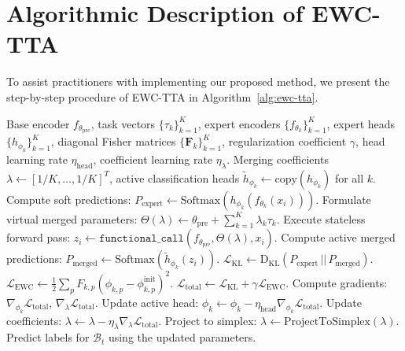 \documentclass{article}
\theoremstyle{plain}
\theoremstyle{definition}
\theoremstyle{remark}
\begin{document}
\section{Algorithmic Description of EWC-TTA}
\label{appendix-algo}

To assist practitioners with implementing our proposed method, we present the step-by-step procedure of EWC-TTA in Algorithm~\ref{alg:ewc-tta}.

\begin{algorithm}[tb]
   \caption{EWC-TTA Test-Time Adaptation}
   \label{alg:ewc-tta}
\begin{algorithmic}[1]
    Base encoder $f_{\theta_{\text{pre}}}$, task vectors $\{\tau_k\}_{k=1}^K$, expert encoders $\{f_{\theta_k}\}_{k=1}^K$, expert heads $\{h_{\phi_k}\}_{k=1}^K$, diagonal Fisher matrices $\{\mathbf{F}_k\}_{k=1}^K$, regularization coefficient $\gamma$, head learning rate $\eta_{\text{head}}$, coefficient learning rate $\eta_\lambda$.
    Merging coefficients $\lambda \leftarrow [1/K, \dots, 1/K]^T$, active classification heads $\tilde{h}_{\phi_k} \leftarrow \text{copy}(h_{\phi_k})$ for all $k$.
   \STATE Compute soft predictions: $P_{\text{expert}} \leftarrow \text{Softmax}(h_{\phi_k}(f_{\theta_k}(x_i)))$.
   \STATE Formulate virtual merged parameters:
   \STATE \quad $\Theta(\lambda) \leftarrow \theta_{\text{pre}} + \sum_{k=1}^K \lambda_k \tau_k$.
   \STATE Execute stateless forward pass:
   \STATE \quad $z_i \leftarrow \texttt{functional\_call}(f_{\theta_{\text{pre}}}, \Theta(\lambda), x_i)$.
   \STATE Compute active merged predictions:
   \STATE \quad $P_{\text{merged}} \leftarrow \text{Softmax}(\tilde{h}_{\phi_k}(z_i))$.
   \STATE $\mathcal{L}_{\text{KL}} \leftarrow \text{D}_{\text{KL}} \left( P_{\text{expert}} \,||\, P_{\text{merged}} \right)$.
   \STATE $\mathcal{L}_{\text{EWC}} \leftarrow \frac{1}{2} \sum_p F_{k, p} \left( \phi_{k, p} - \phi_{k, p}^{\text{init}} \right)^2$.
   \STATE $\mathcal{L}_{\text{total}} \leftarrow \mathcal{L}_{\text{KL}} + \gamma \mathcal{L}_{\text{EWC}}$.
   \STATE Compute gradients: $\nabla_{\phi_k} \mathcal{L}_{\text{total}}$, $\nabla_\lambda \mathcal{L}_{\text{total}}$.
   \STATE Update active head: $\phi_k \leftarrow \phi_k - \eta_{\text{head}} \nabla_{\phi_k} \mathcal{L}_{\text{total}}$.
   \STATE Update coefficients: $\lambda \leftarrow \lambda - \eta_\lambda \nabla_\lambda \mathcal{L}_{\text{total}}$.
   \STATE Project to simplex: $\lambda \leftarrow \text{ProjectToSimplex}(\lambda)$.
   \STATE Predict labels for $\mathcal{B}_t$ using the updated parameters.
   \ENDFOR
\end{algorithmic}
\end{algorithm}
\end{document}
